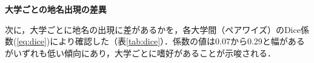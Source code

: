 
\textbf{大学ごとの地名出現の差異}

次に，大学ごとに地名の出現に差があるかを，各大学間（ペアワイズ）のDice係数(\ref{eq:dice})により確認した（表\ref{tab:dice}）．係数の値は0.07から0.29と幅があるがいずれも低い傾向にあり，大学ごとに嗜好があることが示唆される．
